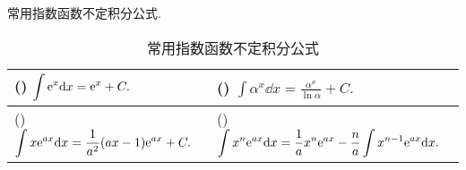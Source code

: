 常用指数函数不定积分公式.
\setcounter{magicrownumbers}{0}
\begin{table}[H]
    \centering
    \caption{常用指数函数不定积分公式}
    \begin{tabular}{l l}
        (\rownumber{}) $\displaystyle\int \mathrm{e} ^{x} \dd  x=\mathrm{e} ^{x}+C.$                              & (\rownumber{}) $\displaystyle\int \alpha^{x} \dd  x=\frac{\alpha^{x}}{\ln \alpha}+C.$                                            \\
        \midrule
        (\rownumber{}) $\displaystyle\int x \mathrm{e} ^{a x} \dd  x=\frac{1}{a^{2}}(a x-1) \mathrm{e} ^{a x}+C.$ & (\rownumber{}) $\displaystyle\int x^{n} \mathrm{e} ^{a x} \dd  x=\frac{1}{a} x^{n} \mathrm{e} ^{a x}-\frac{n}{a} \int x^{n-1} \mathrm{e} ^{a x} \dd  x.$ \\
    \end{tabular}
\end{table}

